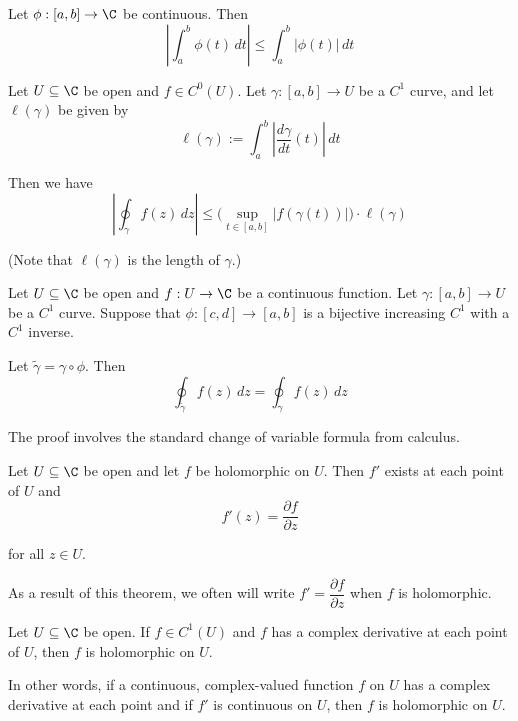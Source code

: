 \label{bcec8b1}

Let $\phi:[a,b]\to\C$ be continuous. Then
$$
	\left|\int_a^b\phi(t)\,dt\right|\leq\int_a^b|\phi(t)|\,dt
$$

\label{faf3f86}

Let $U\subseteq\C$ be open and $f\in C^0(U)$. Let $\gamma:[a,b]\to U$
be a $C^1$ curve, and let $\ell(\gamma)$ be given by
$$
	\ell(\gamma):=\int_a^b\left|\frac{d\gamma}{dt}(t)\right|\,dt
$$

Then we have
$$
	\left|\oint_\gamma f(z)\,dz\right|\leq
	\Big(\sup_{t\in[a,b]}|f(\gamma(t))|\Big)\cdot\ell(\gamma)
$$

(Note that $\ell(\gamma)$ is the length of $\gamma$.)

\label{f74efcb}

Let $U\subseteq\C$ be open and $f:U\to\C$ be a continuous function.
Let $\gamma:[a,b]\to U$ be a $C^1$ curve. Suppose that
$\phi:[c,d]\to[a,b]$ is a bijective increasing $C^1$ with a $C^1$
inverse.


Let $\tilde\gamma=\gamma\circ\phi$. Then
$$\oint_{\tilde\gamma}f(z)\,dz=\oint_\gamma f(z)\,dz$$

The proof involves the standard change of variable formula from
calculus.

\label{f75e43c}

Let $U\subseteq\C$ be open and let $f$ be holomorphic on $U$. Then
$f'$ exists at each point of $U$ and
$$f'(z)=\frac{\partial f}{\partial z}$$

for all $z\in U$.

As a result of this theorem, we often will write $f'=\dfrac{\partial
		f}{\partial z}$ when $f$ is holomorphic.

\label{d037b0f}

Let $U\subseteq\C$ be open. If $f\in C^1(U)$ and $f$ has a complex
derivative at each point of $U$, then $f$ is holomorphic on $U$.

In other words, if a continuous, complex-valued function $f$ on $U$ has
a complex derivative at each point and if $f'$ is continuous on $U$,
then $f$ is holomorphic on $U$.

